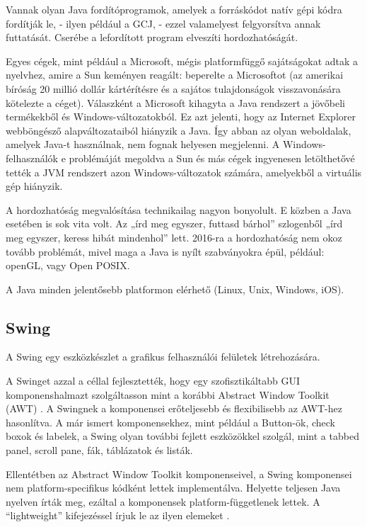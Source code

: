 \documentclass[a4paper,12pt]{report}
\begin{document}
\vspace{2mm}
Vannak olyan Java fordítóprogramok, amelyek a forráskódot natív gépi kódra fordítják le, - ilyen például a GCJ, - ezzel valamelyest felgyorsítva annak futtatását. Cserébe a lefordított program elveszíti hordozhatóságát.

\vspace{2mm}
Egyes cégek, mint például a Microsoft, mégis platformfüggő sajátságokat adtak a nyelvhez, amire a Sun keményen reagált: beperelte a Microsoftot (az amerikai bíróság 20 millió dollár kártérítésre és a sajátos tulajdonságok visszavonására kötelezte a céget). Válaszként a Microsoft kihagyta a Java rendszert a jövőbeli termékekből és Windows-változatokból. Ez azt jelenti, hogy az Internet Explorer webböngésző alapváltozataiból hiányzik a Java. Így abban az olyan weboldalak, amelyek Java-t használnak, nem fognak helyesen megjelenni. A Windows-felhasználók e problémáját megoldva a Sun és más cégek ingyenesen letölthetővé tették a JVM rendszert azon Windows-változatok számára, amelyekből a virtuális gép hiányzik.

\vspace{2mm}
A hordozhatóság megvalósítása technikailag nagyon bonyolult. E közben a Java esetében is sok vita volt. Az „írd meg egyszer, futtasd bárhol” szlogenből „írd meg egyszer, keress hibát mindenhol” lett. 2016-ra a hordozhatóság nem okoz tovább problémát, mivel maga a Java is nyílt szabványokra épül, például: openGL, vagy Open POSIX.

\vspace{2mm}
A Java minden jelentősebb platformon elérhető (Linux, Unix, Windows, iOS).

\subsection{Swing}
\label{swing}

A Swing egy eszközkészlet a grafikus felhasználói felületek létrehozására.

\vspace{2mm}
A Swinget azzal a céllal fejlesztették, hogy egy szofisztikáltabb GUI komponenshalmazt szolgáltasson mint a korábbi Abstract Window Toolkit (AWT) \cite{awt}. A Swingnek a komponensei erőteljesebb és flexibilisebb az AWT-hez hasonlítva. A már ismert komponensekhez, mint például a Button-ök, check boxok és labelek, a Swing olyan további fejlett eszközökkel szolgál, mint a tabbed panel, scroll pane, fák, táblázatok és listák.

\vspace{2mm}
Ellentétben az Abstract Window Toolkit komponenseivel, a Swing komponensei nem platform-specifikus kódként lettek implementálva. Helyette teljesen Java nyelven írták meg, ezáltal a komponensek platform-függetlenek lettek. A ``lightweight'' kifejezéssel írjuk le az ilyen elemeket \cite{swingarticle}.
\end{document}
